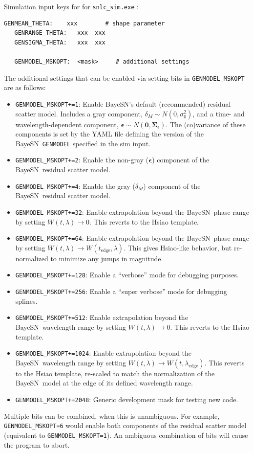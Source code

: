 \documentclass[12pt]{article}
\newcommand{\BAYESN}{{\sc BayeSN}}
\begin{document}
\noindent
Simulation input keys for for {\tt snlc\_sim.exe} :
\begin{Verbatim}[frame=single]
   GENMEAN_THETA:    xxx        # shape parameter
   GENRANGE_THETA:   xxx  xxx
   GENSIGMA_THETA:   xxx  xxx

   GENMODEL_MSKOPT:  <mask>     # additional settings
\end{Verbatim}
The additional settings that can be enabled via setting bits in {\tt GENMODEL\_MSKOPT}
are as follows:
\begin{itemize}
  \item \verb!GENMODEL_MSKOPT+=1!: Enable \BAYESN's default (recommended)
   residual scatter model. Includes a gray component, $\delta_M\sim N(0,\sigma_0^2)$,
   and a time- and wavelength-dependent component, 
   $\mathbf{\epsilon}\sim N(\mathbf{0},\mathbf{\Sigma}_\epsilon)$.
   The (co)variance of these components is set by the YAML file defining the version
   of the \BAYESN\ \texttt{GENMODEL} specified in the sim input.
  \item \verb!GENMODEL_MSKOPT+=2!: Enable the non-gray ($\mathbf{\epsilon}$)
   component of the \BAYESN\ residual scatter model.
  \item \verb!GENMODEL_MSKOPT+=4!: Enable the gray ($\delta_M$) component of the
   \BAYESN\ residual scatter model.
  \item \verb!GENMODEL_MSKOPT+=32!: Enable extrapolation beyond the \BAYESN\ phase range
   by setting $W(t,\lambda) \to 0$. This reverts to the Hsiao template.
  \item \verb!GENMODEL_MSKOPT+=64!: Enable extrapolation beyond the \BAYESN\ phase range
   by setting $W(t,\lambda) \to W(t_\mathrm{edge},\lambda)$. This gives Hsiao-like behavior,
   but re-normalized to minimize any jumps in magnitude.
  \item \verb!GENMODEL_MSKOPT+=128!: Enable a ``verbose'' mode for debugging purposes.
  \item \verb!GENMODEL_MSKOPT+=256!: Enable a ``super verbose'' mode for debugging splines.
  \item \verb!GENMODEL_MSKOPT+=512!: Enable extrapolation beyond the \BAYESN\ wavelength range
   by setting $W(t,\lambda) \to 0$. This reverts to the Hsiao template.
  \item \verb!GENMODEL_MSKOPT+=1024!: Enable extrapolation beyond the \BAYESN\ wavelength range
   by setting $W(t,\lambda) \to W(t,\lambda_\mathrm{edge})$. This reverts to the Hsiao template, re-scaled
   to match the normalization of the \BAYESN\ model at the edge of its defined wavelength range.
  \item \verb!GENMODEL_MSKOPT+=2048!: Generic development mask for testing new code.
\end{itemize}
Multiple bits can be combined, when this is unambiguous. For example, \verb!GENMODEL_MSKOPT=6!
would enable both components of the residual scatter model (equivalent to 
\verb!GENMODEL_MSKOPT=1!). An ambiguous combination of bits will cause the program
to abort.
\end{document}
